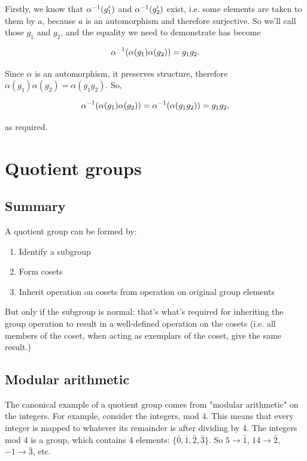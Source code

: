 Firstly, we know that $\alpha^{-1}(g_1')$ and $\alpha^{-1}(g_2')$ exist, i.e. some elements
are taken to them by $a$, because $a$ is an automorphism and therefore
surjective. So we'll call those $g_1$ and $g_2$, and the equality we need to
demonstrate has become

$$
\alpha^{-1}(\alpha(g_1)\alpha(g_2)) = g_1g_2.
$$

Since $\alpha$ is an automorphism, it preserves structure, therefore
$\alpha(g_1)\alpha(g_2) = \alpha(g_1g_2)$. So,

$$
\alpha^{-1}(\alpha(g_1)\alpha(g_2)) = \alpha^{-1}(\alpha(g_1g_2)) = g_1g_2,
$$

as required.
\newcommand{\textstack}[2]{
  \left(\begin{array}{c}
    \text{#1}  \\
    \text{#2}
  \end{array}\right)
}

\section{Quotient groups}

\subsection{Summary}
A quotient group can be formed by:
\begin{enumerate}
\item Identify a subgroup
\item Form cosets
\item Inherit operation on cosets from operation on original group elements
\end{enumerate}
But only if the subgroup is normal: that's what's required for inheriting the
group operation to result in a well-defined operation on the cosets (i.e. all
members of the coset, when acting as exemplars of the coset, give the same
result.)

\subsection{Modular arithmetic}

The canonical example of a quotient group comes from "modular arithmetic" on
the integers. For example, consider the integers, mod 4. This means that every
integer is mapped to whatever its remainder is after dividing by 4. The
integers mod 4 is a group, which contains 4 elements: $\{\bar 0, \bar 1, \bar
2, \bar 3\}$. So $5 \rightarrow \bar 1$, $14 \rightarrow \bar 2$, $-1
\rightarrow \bar 3$, etc.

